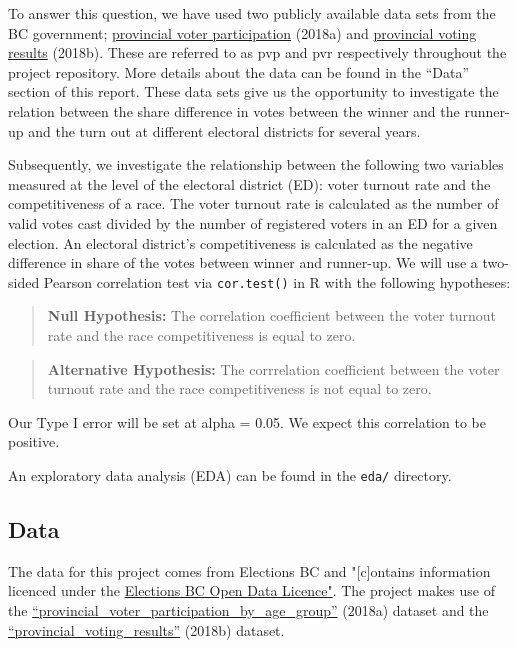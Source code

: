 \documentclass[
]{article}
\begin{document}
To answer this question, we have used two publicly available data sets
from the BC government;
\href{https://catalogue.data.gov.bc.ca/dataset/6d9db663-8c30-43ec-922b-d541d22e634f/resource/646530d4-078c-4815-8452-c75639962bb4}{provincial
voter participation} (2018a) and
\href{https://catalogue.data.gov.bc.ca/dataset/44914a35-de9a-4830-ac48-870001ef8935/resource/fb40239e-b718-4a79-b18f-7a62139d9792}{provincial
voting results} (2018b). These are referred to as pvp and pvr
respectively throughout the project repository. More details about the
data can be found in the ``Data'' section of this report. These data
sets give us the opportunity to investigate the relation between the
share difference in votes between the winner and the runner-up and the
turn out at different electoral districts for several years.

Subsequently, we investigate the relationship between the following two
variables measured at the level of the electoral district (ED): voter
turnout rate and the competitiveness of a race. The voter turnout rate
is calculated as the number of valid votes cast divided by the number of
registered voters in an ED for a given election. An electoral district's
competitiveness is calculated as the negative difference in share of the
votes between winner and runner-up. We will use a two-sided Pearson
correlation test via \texttt{cor.test()} in R with the following
hypotheses:

\begin{quote}
\textbf{Null Hypothesis:} The correlation coefficient between the voter
turnout rate and the race competitiveness is equal to zero.
\end{quote}

\begin{quote}
\textbf{Alternative Hypothesis:} The corrrelation coefficient between
the voter turnout rate and the race competitiveness is not equal to
zero.
\end{quote}

Our Type I error will be set at alpha = 0.05. We expect this correlation
to be positive.

An exploratory data analysis (EDA) can be found in the \texttt{eda/}
directory.

\hypertarget{data}{%
\subsection{Data}\label{data}}

The data for this project comes from Elections BC and "{[}c{]}ontains
information licenced under the
\href{https://www.elections.bc.ca/docs/EBC-Open-Data-Licence.pdf}{Elections
BC Open Data Licence"}. The project makes use of the
\href{https://catalogue.data.gov.bc.ca/dataset/6d9db663-8c30-43ec-922b-d541d22e634f/resource/646530d4-078c-4815-8452-c75639962bb4}{``provincial\_voter\_participation\_by\_age\_group''}
(2018a) dataset and the
\href{https://catalogue.data.gov.bc.ca/dataset/44914a35-de9a-4830-ac48-870001ef8935/resource/fb40239e-b718-4a79-b18f-7a62139d9792}{``provincial\_voting\_results''}
(2018b) dataset.
\end{document}
